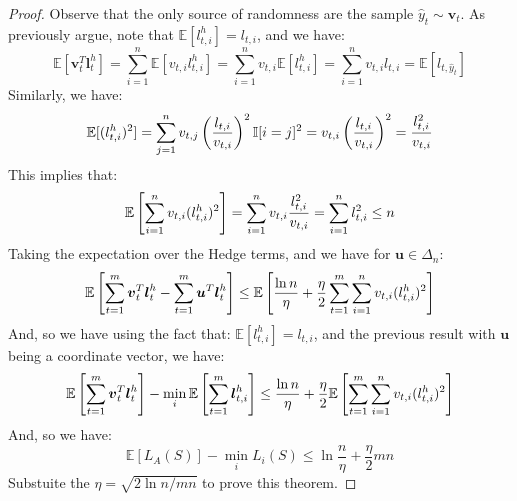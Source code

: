 \begin{proof}
    Observe that the only source of randomness are the sample $\hat{y}_t \sim \boldsymbol v_t$. As previously argue, note that $\mathbb{E}[l^h_{t, i}] = l_{t, i}$, and we have:
    \begin{equation*}
        \mathbb{E}[\boldsymbol v_t^T\boldsymbol l^h_t] = \sum^n_{i=1}\mathbb{E}[v_{t, i}l^h_{t, i}] = \sum^n_{i=1}v_{t, i}\mathbb{E}[l^h_{t, i}] = \sum^n_{i=1}v_{t, i}l_{t, i} = \mathbb{E}[l_{t, \hat{y}_t}]
    \end{equation*}
    Similarly, we have:
    \begin{equation*}
        \mathbb{E}[(l^h_{t, i})^2] = \sum^n_{j=1}v_{t, j}\left( \frac{l_{t, i}}{v_{t, i}} \right)^2 \mathbb{I}[i = j]^2 = v_{t,i}\left( \frac{l_{t,i}}{v_{t, i}} \right)^2 = \frac{l^2_{t, i}}{v_{t, i}}
    \end{equation*}
    This implies that:
    \begin{equation*}
        \mathbb{E}\left[ \sum^n_{i=1} v_{t, i}(l^h_{t, i})^2  \right] = \sum^n_{i=1}v_{t, i}\frac{l^2_{t, i}}{v_{t, i}} = \sum^n_{i=1}l^2_{t, i} \le n
    \end{equation*}
    Taking the expectation over the Hedge terms, and we have for $\boldsymbol u \in \Delta_n$:
    \begin{equation*}
        \mathbb{E}\left[ \sum^m_{t=1}\boldsymbol v_t^T\boldsymbol l^h_t - \sum^m_{t=1}\boldsymbol u^T\boldsymbol l^h_t \right] \le \mathbb{E}\left[ \frac{\ln n}{\eta} + \frac{\eta}{2}\sum^m_{t=1}\sum^n_{i=1}v_{t, i}(l^h_{t, i})^2 \right]
    \end{equation*}
    And, so we have using the fact that: $\mathbb{E}[l^h_{t, i}] = l_{t, i}$, and the previous result with $\boldsymbol u$ being a coordinate vector, we have:
    \begin{equation*}
        \mathbb{E}\left[ \sum^m_{t=1}\boldsymbol v_t^T\boldsymbol l^h_t \right] - \min_i\mathbb{E}\left[ \sum^m_{t=1}\boldsymbol l^h_{t, i} \right] \le \frac{\ln n}{\eta} + \frac{\eta}{2}\mathbb{E}\left[ \sum^m_{t=1}\sum^n_{i=1}v_{t, i}(l^h_{t, i})^2 \right]
    \end{equation*}
    And, so we have:
    \begin{equation*}
        \mathbb{E}[L_A(S)] - \min_i L_i(S) \le \ln\frac{n}{\eta} + \frac{\eta}{2}mn
    \end{equation*}
    Substuite the $\eta = \sqrt{2\ln n/mn}$ to prove this theorem.
\end{proof}
